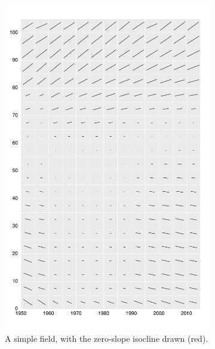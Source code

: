 \documentclass{article}
\begin{document}
\begin{figure}
\begin{subfigure}{.5\textwidth}
  \includegraphics[scale=.4]{Figures/FigApp2.pdf}
  \caption{A simple field, with the zero-slope isocline drawn (red).}
  \label{fig:sfig2}
\end{subfigure}
\begin{subfigure}{.5\textwidth}
  \centering

\end{subfigure}
\end{figure}
\end{document}
